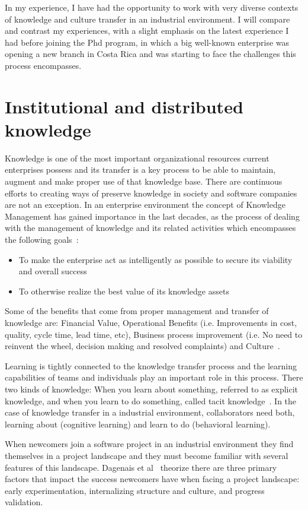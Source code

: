 \documentclass[12pt, letterpaper]{article}
\begin{document}
In my experience, I have had the opportunity to work with very diverse contexts of knowledge and culture transfer in 
an industrial environment. I will compare and contrast my experiences, with a slight emphasis on the 
latest experience I had before joining the Phd program, in which a big well-known enterprise was 
opening a new branch in Costa Rica and was starting to face the challenges this process encompasses.  


\section{Institutional and distributed knowledge}
Knowledge is one of the most important organizational resources current enterprises possess
and its transfer is a key process to be able to maintain, augment and
make proper use of that knowledge base. 
There are continuous efforts to creating ways of preserve knowledge in society and software 
companies are not an exception. In an enterprise environment the concept of Knowledge Management
has gained importance in the last decades, as the process of dealing with the management 
of knowledge and its related activities which encompasses 
the following goals~\cite{wiig97}: 
\begin{itemize}
\item To make the enterprise act as intelligently as possible to secure its viability and overall success
\item To otherwise realize the best value of its knowledge assets
\end{itemize}
Some of the benefits that come from proper management and transfer of knowledge are: Financial
Value, Operational Benefits (i.e. Improvements in cost, quality, cycle time, lead time, etc), Business process improvement (i.e. No need to reinvent the wheel, decision making and resolved complaints) and Culture~\cite{ibrahim09}. 

Learning is tightly connected to the knowledge transfer
process and the learning capabilities of teams and individuals play an important role in 
this process.
There two kinds of knowledge: When you learn about something, referred to as explicit 
knowledge, and when you learn to do something, called tacit knowledge~\cite{cook99}. 
In the case of knowledge transfer in a industrial environment, collaborators need both, 
learning about (cognitive learning) and learn to do (behavioral learning).

When newcomers join a software project in an industrial environment they find themselves in a project
landscape and they must become familiar with several features of this landscape.
Dagenais et al~\cite{Dagenais10} theorize there are three primary factors that impact the 
success newcomers have when facing a project landscape: early experimentation, internalizing structure
and culture, and progress validation.
\end{document}
